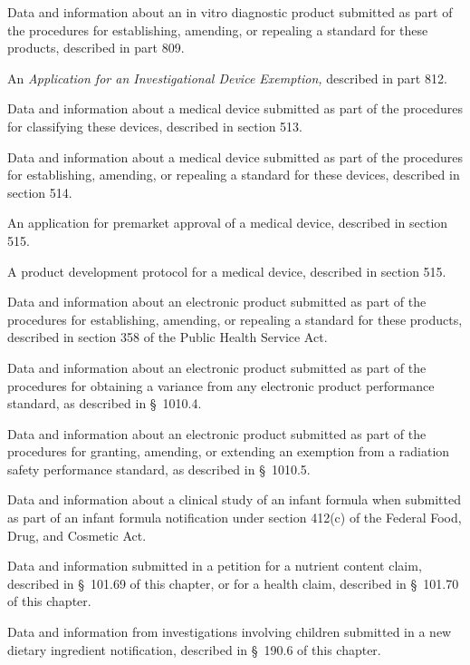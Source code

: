 \documentclass[11pt]{article}
\begin{document}
\begin{description}[leftmargin=1.0cm,style=sameline]
\item[(14)] Data and information about an in vitro diagnostic product submitted as part of the procedures for establishing, amending, or repealing a standard for these products, described in part 809.
\item[(15)] An \textit{Application for an Investigational Device Exemption,} described in part 812.
\item[(16)] Data and information about a medical device submitted as part of the procedures for classifying these devices, described in section 513.
\item[(17)] Data and information about a medical device submitted as part of the procedures for establishing, amending, or repealing a standard for these devices, described in section 514.
\item[(18)] An application for premarket approval of a medical device, described in section 515.
\item[(19)] A product development protocol for a medical device, described in section 515.
\item[(20)] Data and information about an electronic product submitted as part of the procedures for establishing, amending, or repealing a standard for these products, described in section 358 of the Public Health Service Act.
\item[(21)] Data and information about an electronic product submitted as part of the procedures for obtaining a variance from any electronic product performance standard, as described in \S~1010.4.
\item[(22)] Data and information about an electronic product submitted as part of the procedures for granting, amending, or extending an exemption from a radiation safety performance standard, as described in \S~1010.5.
\item[(23)] Data and information about a clinical study of an infant formula when submitted as part of an infant formula notification under section 412(c) of the Federal Food, Drug, and Cosmetic Act.
\item[(24)] Data and information submitted in a petition for a nutrient content claim, described in \S~101.69 of this chapter, or for a health claim, described in \S~101.70 of this chapter.
\item[(25)] Data and information from investigations involving children submitted in a new dietary ingredient notification, described in \S~190.6 of this chapter.
\end{description}
\end{document}
